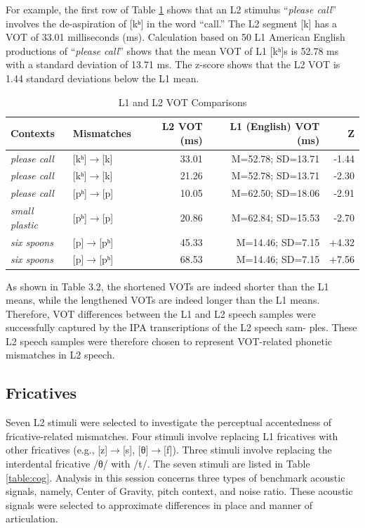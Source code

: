For example, the first row of Table \ref{table:vot} shows that an L2 stimulus “\textit{please call}” involves the de-aspiration of [kʰ] in the word “call.” The L2 segment [k] has a VOT of 33.01 milliseconds (ms). Calculation based on 50 L1 American English productions of “\textit{please call}” shows that the mean VOT of L1 [kʰ]s is 52.78 ms with a standard deviation of 13.71 ms. The z-score shows that the L2 VOT is 1.44 standard deviations below the L1 mean. 

\begin{table}[!h]
  \figSpace
  \centering
  \caption{L1 and L2 VOT Comparisons}
\label{table:vot}
    \begin{tabular}{llrrr}
    \toprule
   Contexts & Mismatches & L2 VOT (ms) & L1 (English) VOT (ms) & Z \\
    \midrule
    \textit{please call} & [kʰ]$\rightarrow$[k] & 33.01 & M=52.78; SD=13.71 & -1.44 \\
    \textit{please call} & [kʰ]$\rightarrow$[k] & 21.26 & M=52.78; SD=13.71 & -2.30 \\
    \textit{please call} & [pʰ]$\rightarrow$[p] & 10.05 & M=62.50; SD=18.06 & -2.91 \\
    \textit{small plastic} & [pʰ]$\rightarrow$[p] & 20.86 & M=62.84; SD=15.53 & -2.70 \\
    \textit{six spoons} & [p]$\rightarrow$[pʰ] & 45.33 & M=14.46; SD=7.15 & +4.32 \\
    \textit{six spoons} & [p]$\rightarrow$[pʰ] & 68.53 & M=14.46; SD=7.15 & +7.56 \\
    \bottomrule
    \end{tabular}%
  \figSpace
\end{table}%


As shown in Table 3.2, the shortened VOTs are indeed shorter than the L1 means, while the lengthened VOTs are indeed longer than the L1 means. Therefore, VOT differences between the L1 and L2 speech samples were successfully captured by the IPA transcriptions of the L2 speech sam- ples. These L2 speech samples were therefore chosen to represent VOT-related phonetic mismatches in L2 speech.

\subsection{Fricatives} 

Seven L2 stimuli were selected to investigate the perceptual accentedness of fricative-related mismatches. Four stimuli involve replacing L1 fricatives with other fricatives (e.g., [z]$\rightarrow$[s], [θ]$\rightarrow$[f]). Three stimuli involve replacing the interdental fricative /θ/ with /t/. The seven stimuli are listed in Table \ref{table:cog}. Analysis in this session concerns three types of benchmark acoustic signals, namely, Center of Gravity, pitch context, and noise ratio. These acoustic signals were selected to approximate differences in place and manner of articulation.

